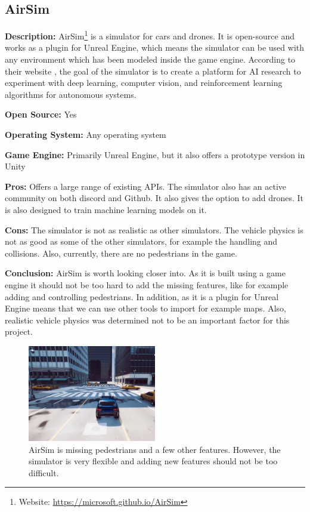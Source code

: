 \subsection{AirSim} \label{AirSimDoc}
\textbf{Description:} AirSim\footnote{Website: \url{https://microsoft.github.io/AirSim}} is a simulator for cars and drones. It is open-source and works as a plugin for Unreal Engine, which means the simulator can be used with any environment which has been modeled inside the game engine. According to their website \cite{AirSim_Website}, the goal of the simulator is to create a platform for AI research to experiment with deep learning, computer vision, and reinforcement learning algorithms for autonomous systems. 

\textbf{Open Source:} Yes

\textbf{Operating System:} Any operating system

\textbf{Game Engine:} Primarily Unreal Engine, but it also offers a prototype version in Unity

\textbf{Pros:} Offers a large range of existing APIs. The simulator also has an active community on both discord and Github. It also gives the option to add drones. It is also designed to train machine learning models on it.

\textbf{Cons:} The simulator is not as realistic as other simulators. The vehicle physics is not as good as some of the other simulators, for example the handling and collisions. Also, currently, there are no pedestrians in the game. 

\textbf{Conclusion:} AirSim is worth looking closer into. As it is built using a game engine it should not be too hard to add the missing features, like for example adding and controlling pedestrians. In addition, as it is a plugin for Unreal Engine means that we can use other tools to import for example maps. Also, realistic vehicle physics was determined not to be an important factor for this project. 

\begin{figure}[H]
    \centering
    \includegraphics[width=0.5\textwidth]{03_Background/Appendix/Simulators/AirSim.JPG}
    \caption[AirSim]{AirSim is missing pedestrians and a few other features. However, the simulator is very flexible and adding new features should not be too difficult.}
\end{figure}

